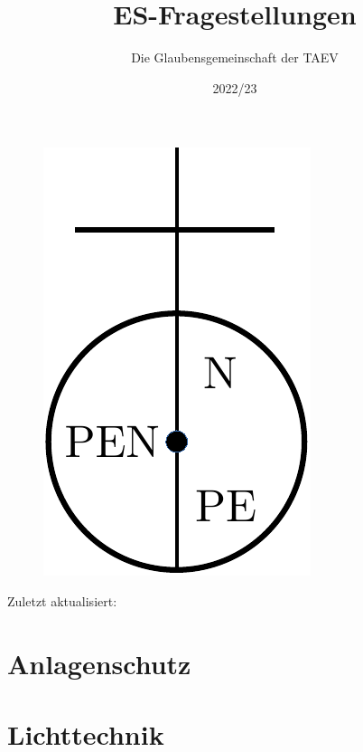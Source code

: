 \documentclass[12pt]{article}
\title{\LARGE \textbf{ES-Fragestellungen}}
\date{2022/23}
\author{Die Glaubensgemeinschaft der TAEV}
\begin{document}
    \lhead{}
    \rhead{}

    \begin{titlepage}
        \centering
        \begin{figure}
            \centering
            \includegraphics{nullung.pdf}
        \end{figure}

        \maketitle 
        \begin{center}
            Zuletzt aktualisiert: \textbf{\filemodprintdate{\jobname}}
        \end{center}
        \clearpage
        \tableofcontents
    \end{titlepage}


    \cfoot{}


    \section{Anlagenschutz}
    
    

    \section{Lichttechnik}
    
    
\end{document}
